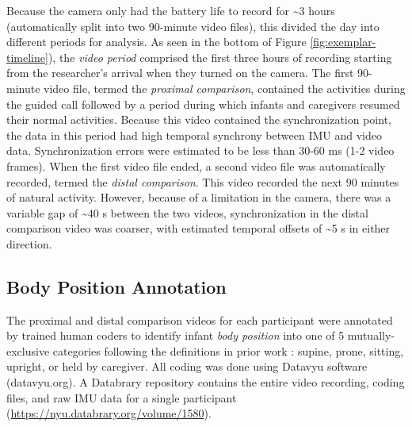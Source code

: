 \documentclass[
  man]{apa6}
\begin{document}
Because the camera only had the battery life to record for \textasciitilde3 hours (automatically split into two 90-minute video files), this divided the day into different periods for analysis. As seen in the bottom of Figure \ref{fig:exemplar-timeline}), the \emph{video period} comprised the first three hours of recording starting from the researcher's arrival when they turned on the camera. The first 90-minute video file, termed the \emph{proximal comparison}, contained the activities during the guided call followed by a period during which infants and caregivers resumed their normal activities. Because this video contained the synchronization point, the data in this period had high temporal synchrony between IMU and video data. Synchronization errors were estimated to be less than 30-60 ms (1-2 video frames). When the first video file ended, a second video file was automatically recorded, termed the \emph{distal comparison}. This video recorded the next 90 minutes of natural activity. However, because of a limitation in the camera, there was a variable gap of \textasciitilde40 s between the two videos, synchronization in the distal comparison video was coarser, with estimated temporal offsets of \textasciitilde5 s in either direction.

\hypertarget{body-position-annotation}{%
\subsection{Body Position Annotation}\label{body-position-annotation}}

The proximal and distal comparison videos for each participant were annotated by trained human coders to identify infant \emph{body position} into one of 5 mutually-exclusive categories following the definitions in prior work \autocite{FranchakScott2021}: supine, prone, sitting, upright, or held by caregiver. All coding was done using Datavyu software (datavyu.org). A Databrary repository contains the entire video recording, coding files, and raw IMU data for a single participant (\url{https://nyu.databrary.org/volume/1580}).
\end{document}
